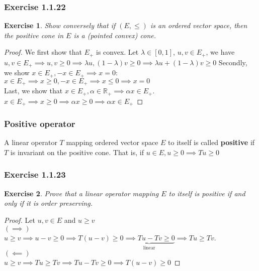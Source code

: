 \documentclass[11pt,xcolor={dvipsnames},hyperref={pdftex,pdfpagemode=UseNone,hidelinks,pdfdisplaydoctitle=true},usepdftitle=false]{beamer}
\newtheorem{exercise}{Exercise}[section]
\begin{document}
\begin{frame}
\frametitle{Exercise 1.1.22}

\begin{exercise}
Show conversely that if $(E, \leq)$ is an ordered vector space, then the positive cone in $E$ is a (pointed convex) cone.
\end{exercise}

\begin{proof}
We first show that $E_+$ is convex. Let $\lambda\in [0,1]$, $u,v\in E_+$, we have\\
$u,v\in E_+\implies u, v\ge 0 \implies \lambda u, (1-\lambda)v \ge 0\implies \lambda u+(1-\lambda) v\ge 0$
Secondly, we show $x\in E_+, -x\in E_+\implies x=0$: $x\in E_+\implies x\ge 0, -x\in E_+\implies x\le 0 \implies x=0$\\
Last, we show that $x\in E_+, \alpha \in \mathbb{R}_+ \implies \alpha x\in E_+$.\\
$x\in E_+\implies x\ge 0\implies \alpha x\ge 0\implies \alpha x\in E_+$
\end{proof}
\end{frame}
\begin{frame}
\frametitle{Positive operator}
\begin{definition}
A linear operator $T$ mapping ordered vector space $E$ to itself is called \textbf{positive} if $T$ is invariant on the positive cone. That is, if $u\in E, u\ge 0\implies Tu\ge 0$
\end{definition}
\end{frame}
\begin{frame}
\frametitle{Exercise 1.1.23}
\begin{exercise}
Prove that a linear operator mapping $E$ to itself is positive if and only if it is order preserving.
\end{exercise}

\begin{proof}
Let $u,v\in E$ and $u\ge v$\\
$(\implies)$\\
$u\ge v\implies u-v\ge 0\implies T(u-v)\ge 0\underbrace{\implies Tu-Tv\ge 0}_{\text{linear}}\implies Tu\ge Tv$. \\
$(\impliedby)$\\
$u\ge v\implies Tu\ge Tv\implies Tu-Tv\ge 0\implies T(u-v)\ge 0$
\end{proof}
\end{frame}
\end{document}
